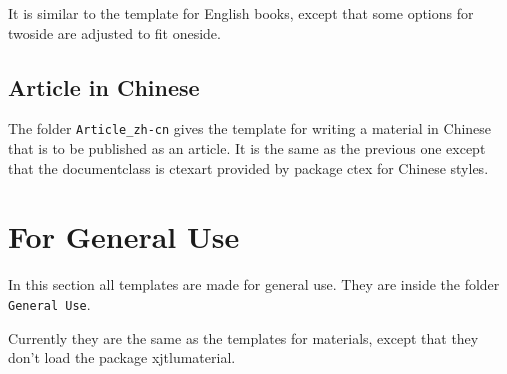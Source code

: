 It is similar to the template for English books, except that some options for twoside are adjusted to fit oneside.

\subsection{Article in Chinese}
The folder \verb=Article_zh-cn= gives the template for writing a material in Chinese that is to be published as an article. It is the same as the previous one except that the documentclass is ctexart provided by package ctex for Chinese styles.

\section{For General Use}
In this section all templates are made for general use. They are inside the folder \verb|General Use|.

Currently they are the same as the templates for materials, except that they don't load the package xjtlumaterial.
